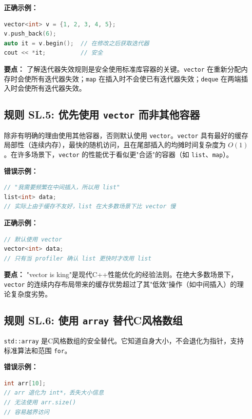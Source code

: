 \textbf{正确示例：}

\begin{lstlisting}[language=C++]
vector<int> v = {1, 2, 3, 4, 5};
v.push_back(6);
auto it = v.begin();  // 在修改之后获取迭代器
cout << *it;          // 安全
\end{lstlisting}

\textbf{要点：} 了解迭代器失效规则是安全使用标准库容器的关键。\texttt{vector} 在重新分配内存时会使所有迭代器失效；\texttt{map} 在插入时不会使已有迭代器失效；\texttt{deque} 在两端插入时会使所有迭代器失效。

\subsection*{\textbf{规则 SL.5:} 优先使用 \texttt{vector} 而非其他容器}

除非有明确的理由使用其他容器，否则默认使用 \texttt{vector}。\texttt{vector} 具有最好的缓存局部性（连续内存），最快的随机访问，且在尾部插入的均摊时间复杂度为 $O(1)$。在许多场景下，\texttt{vector} 的性能优于看似更"合适"的容器（如 \texttt{list}、\texttt{map}）。

\textbf{错误示例：}

\begin{lstlisting}[language=C++]
// "我需要频繁在中间插入，所以用 list"
list<int> data;
// 实际上由于缓存不友好，list 在大多数场景下比 vector 慢
\end{lstlisting}

\textbf{正确示例：}

\begin{lstlisting}[language=C++]
// 默认使用 vector
vector<int> data;
// 只有当 profiler 确认 list 更快时才改用 list
\end{lstlisting}

\textbf{要点：} "vector is king"是现代C++性能优化的经验法则。在绝大多数场景下，\texttt{vector} 的连续内存布局带来的缓存优势超过了其"低效"操作（如中间插入）的理论复杂度劣势。

\subsection*{\textbf{规则 SL.6:} 使用 \texttt{array} 替代C风格数组}

\texttt{std::array} 是C风格数组的安全替代。它知道自身大小，不会退化为指针，支持标准算法和范围 \texttt{for}。

\textbf{错误示例：}

\begin{lstlisting}[language=C++]
int arr[10];
// arr 退化为 int*，丢失大小信息
// 无法使用 arr.size()
// 容易越界访问
\end{lstlisting}

